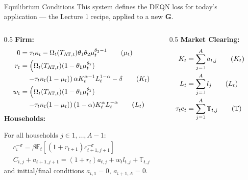 \documentclass[aspectratio=169,11pt]{beamer}
\begin{document}
\begin{frame}[fragile]{Equilibrium Conditions}
{\footnotesize This system defines the DEQN loss for today's application --- the Lecture 1 recipe, applied to a new $\mathbf{G}$.}
\begin{footnotesize}
  \begin{columns}[t]
        \begin{column}{0.5\textwidth}
        \textbf{Firm:}
            \begin{align}
                0 & = \tau_t \kappa_t  - \Omega_t (T_{\mathrm{AT}, t}) \theta_1 \theta_2 \mu_t^{\theta_2 -1} \tag{$\mu_t$}\\
                r_t & = \left( \Omega_t (T_{\mathrm{AT}, t}) (1 - \theta_1 \mu_t^{\theta_2}) \right. \notag \\
                    & \quad \left. - \tau_t \kappa_t (1 - \mu_t) \right) \alpha K_t^{\alpha - 1} L_t^{1 - \alpha} - \delta \tag{$K_t$}\\
                w_t & = \left( \Omega_t (T_{\mathrm{AT}, t}) (1 - \theta_1 \mu_t^{\theta_2}) \right. \notag\\
                    & \quad \left. - \tau_t \kappa_t (1 - \mu_t) \right) (1 - \alpha) K_t^{\alpha} L_t^{-\alpha} \tag{$L_t$}
            \end{align}
            \textbf{Households:}

            For all households $j \in 1,...,A-1$:
            \begin{align}
                c_t^{-\sigma}  = \beta \mathbb{E}_t \left[ (1+ r_{t+1}) c_{t+1,j+1}^{-\sigma} \right] \tag{EE} \\
                C_{t,j} + a_{t+1, j+1}  =  (1 + r_t) a_{t,j} + w_{t} l_{t,j} + \mathbb{T}_{t,j}  \tag{BC}
            \end{align}
            and initial/final conditions $a_{t,1} = 0$, $a_{t+1,A} = 0$.
        \end{column}
        \begin{column}{0.5\textwidth}
            \textbf{Market Clearing:}
            \begin{align}
                K_t & = \sum_{j = 1}^{A} a_{t,j} \tag{$K_t$}\\
            L_t & = \sum_{j = 1}^{A} l_j \tag{$L_t$} \\
            \tau_{t} e_t & = \sum_{j=1}^{A} \mathbb{T}_{t,j}  \tag{$\mathbb{T}$}
            \end{align}
        \end{column}
  \end{columns}
\end{footnotesize}
\end{frame}
\end{document}
